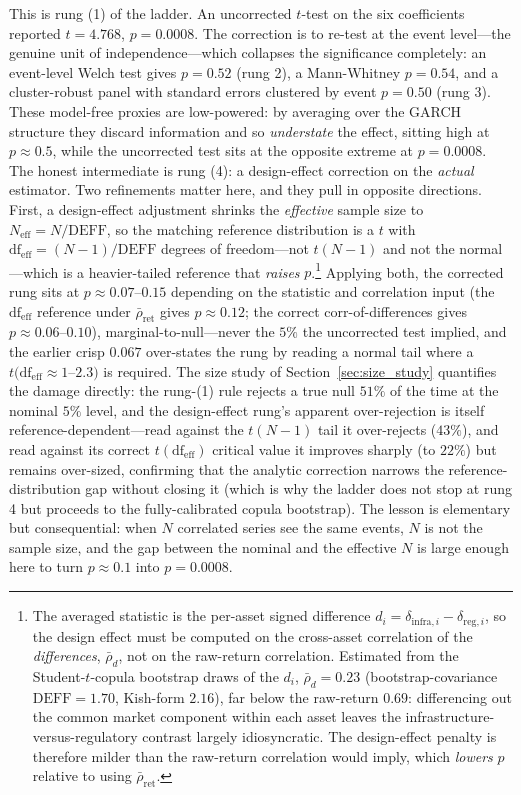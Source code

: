 \documentclass[pdflatex,sn-mathphys-num]{sn-jnl}
\theoremstyle{thmstyleone}
\theoremstyle{thmstyletwo}
\theoremstyle{thmstylethree}
\begin{document}
This is rung (1) of the ladder. An uncorrected $t$-test on the six coefficients reported $t=4.768$, $p=0.0008$. The correction is to re-test at the event level---the genuine unit of independence---which collapses the significance completely: an event-level Welch test gives $p=0.52$ (rung 2), a Mann-Whitney $p=0.54$, and a cluster-robust panel with standard errors clustered by event $p=0.50$ (rung 3). These model-free proxies are low-powered: by averaging over the GARCH structure they discard information and so \emph{understate} the effect, sitting high at $p\approx 0.5$, while the uncorrected test sits at the opposite extreme at $p=0.0008$. The honest intermediate is rung (4): a design-effect correction on the \emph{actual} estimator. Two refinements matter here, and they pull in opposite directions. First, a design-effect adjustment shrinks the \emph{effective} sample size to $N_{\text{eff}}=N/\mathrm{DEFF}$, so the matching reference distribution is a $t$ with $\mathrm{df}_{\text{eff}}=(N-1)/\mathrm{DEFF}$ degrees of freedom---not $t(N-1)$ and not the normal---which is a heavier-tailed reference that \emph{raises} $p$.\footnote{The averaged statistic is the per-asset signed difference $d_i=\delta_{\text{infra},i}-\delta_{\text{reg},i}$, so the design effect must be computed on the cross-asset correlation of the \emph{differences}, $\bar\rho_d$, not on the raw-return correlation. Estimated from the Student-$t$-copula bootstrap draws of the $d_i$, $\bar\rho_d=0.23$ (bootstrap-covariance $\mathrm{DEFF}=1.70$, Kish-form $2.16$), far below the raw-return $0.69$: differencing out the common market component within each asset leaves the infrastructure-versus-regulatory contrast largely idiosyncratic. The design-effect penalty is therefore milder than the raw-return correlation would imply, which \emph{lowers} $p$ relative to using $\bar\rho_{\text{ret}}$.} Applying both, the corrected rung sits at $p\approx 0.07$--$0.15$ depending on the statistic and correlation input (the $\mathrm{df}_{\text{eff}}$ reference under $\bar\rho_{\text{ret}}$ gives $p\approx 0.12$; the correct corr-of-differences gives $p\approx 0.06$--$0.10$), marginal-to-null---never the $5\%$ the uncorrected test implied, and the earlier crisp $0.067$ over-states the rung by reading a normal tail where a $t(\mathrm{df}_{\text{eff}}\approx 1$--$2.3)$ is required. The size study of Section~\ref{sec:size_study} quantifies the damage directly: the rung-(1) rule rejects a true null $51\%$ of the time at the nominal $5\%$ level, and the design-effect rung's apparent over-rejection is itself reference-dependent---read against the $t(N-1)$ tail it over-rejects ($43\%$), and read against its correct $t(\mathrm{df}_{\text{eff}})$ critical value it improves sharply (to $22\%$) but remains over-sized, confirming that the analytic correction narrows the reference-distribution gap without closing it (which is why the ladder does not stop at rung 4 but proceeds to the fully-calibrated copula bootstrap). The lesson is elementary but consequential: when $N$ correlated series see the same events, $N$ is not the sample size, and the gap between the nominal and the effective $N$ is large enough here to turn $p\approx 0.1$ into $p=0.0008$.
\end{document}
